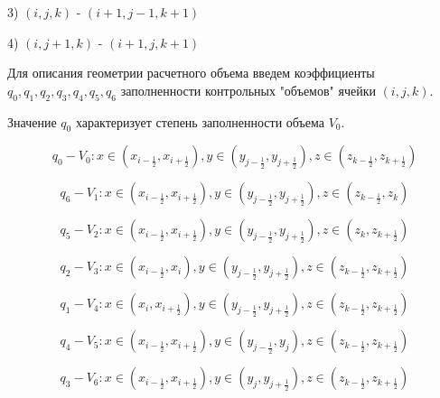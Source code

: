 \documentclass[12pt]{article}
\begin{document}
3) ${(i,j,k)}$ - ${(i+1,j-1,k+1)}$ 

4) ${(i,j+1,k)}$ - ${(i+1,j,k+1)}$ 

{\color{red}{Читай метод конечных объемов (Рояк)}}


Для описания геометрии расчетного объема введем коэффициенты ${q_0, q_1,q_2,q_3,q_4,q_5,q_6}$ заполненности контрольных "объемов" ячейки ${(i,j,k)}$.

Значение ${q_0}$ характеризует степень заполненности объема ${V_0}$.

\begin{equation*}
{q_0} - {V_0}: x\in (x_{i-\frac{1}{2} }, x_{i+\frac{1}{2} } ),  y\in (y_{j-\frac{1}{2} }, y_{j+\frac{1}{2} } ),  z\in (z_{k-\frac{1}{2} }, z_{k+\frac{1}{2} } )
\end{equation*}

\begin{equation*}
{q_6} - {V_1}: x\in (x_{i-\frac{1}{2} }, x_{i+\frac{1}{2} } ),  y\in (y_{j-\frac{1}{2} }, y_{j+\frac{1}{2} } ),  z\in (z_{k-\frac{1}{2} }, z_k )
\end{equation*}

\begin{equation*}
{q_5} - {V_2}: x\in (x_{i-\frac{1}{2} }, x_{i+\frac{1}{2} } ),  y\in (y_{j-\frac{1}{2} }, y_{j+\frac{1}{2} } ),  z\in (z_k, z_{k+\frac{1}{2} } )
\end{equation*}

\begin{equation*}
{q_2} - {V_3}: x\in (x_{i-\frac{1}{2} }, x_i ),  y\in (y_{j-\frac{1}{2} }, y_{j+\frac{1}{2} } ),  z\in (z_{k-\frac{1}{2} }, z_{k+\frac{1}{2} } )
\end{equation*}

\begin{equation*}
{q_1} - {V_4}: x\in (x_i, x_{i+\frac{1}{2} } ),  y\in (y_{j-\frac{1}{2} }, y_{j+\frac{1}{2} } ),  z\in (z_{k-\frac{1}{2} }, z_{k+\frac{1}{2} } )
\end{equation*}

\begin{equation*}
{q_4} - {V_5}: x\in (x_{i-\frac{1}{2} }, x_{i+\frac{1}{2} } ),  y\in (y_{j-\frac{1}{2} }, y_j ),  z\in (z_{k-\frac{1}{2} }, z_{k+\frac{1}{2} } )
\end{equation*}

\begin{equation*}
{q_3} - {V_6}: x\in (x_{i-\frac{1}{2} }, x_{i+\frac{1}{2} } ),  y\in (y_j, y_{j+\frac{1}{2} } ),  z\in (z_{k-\frac{1}{2} }, z_{k+\frac{1}{2} } )
\end{equation*}
\end{document}
